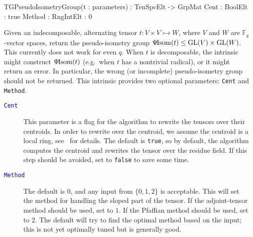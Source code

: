 \documentclass{documentation}
\DeclareMathOperator{\isom}{Isom}
\DeclareMathOperator{\GL}{{\rm GL}}
\newcommand{\pseudo}{\Psi\hspace*{-1mm}\isom}
\begin{document}
\begin{intrinsics}
TGPseudoIsometryGroup(t : parameters) : TenSpcElt -> GrpMat
    Cent : BoolElt : true
    Method : RngIntElt : 0
\end{intrinsics}

Given an indecomposable, alternating tensor $t : V \times V \rightarrowtail W$, where $V$ and $W$ are $\mathbb{F}_q$-vector spaces, return the pseudo-isometry group $\pseudo(t)\leq \GL(V)\times \GL(W)$.
This currently does not work for even $q$. When $t$ is decomposable, the intrinsic might construct $\pseudo(t)$ (e.g.\ when $t$ has a nontrivial radical), or it might return an error. In particular, the wrong (or incomplete) pseudo-isometry group should not be returned. 
This intrinsic provides two optional parameters: \texttt{Cent} and \texttt{Method}. 

\begin{description}
\item[\textcolor{blue}{\tt Cent}]
This parameter is a flag for the algorithm to rewrite the tensors over their centroids. In order to rewrite over the centroid, we assume the centroid is a local ring, see~\cite{TensorSpacePackage} for details. The default is \texttt{true}, so by default, the algorithm computes the centroid and rewrites the tensor over the residue field.
If this step should be avoided, set to \texttt{false} to save some time.
\item[\textcolor{blue}{\tt Method}]
The default is $0$, and any input from $\{ 0,1,2\}$ is acceptable. 
This will set the method for handling the sloped part of the tensor.
If the adjoint-tensor method should be used, set to $1$. If the Pfaffian method should be used, set to $2$. The default will try to find the optimal method based on the input; this is not yet optimally tuned but is generally good.
\end{description}
\end{document}
